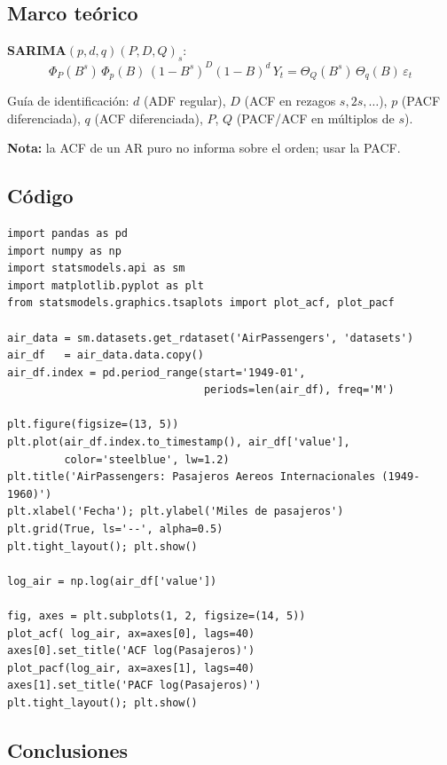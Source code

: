 \documentclass[12pt,letterpaper]{article}
\begin{document}
\subsection{Marco te\'orico}

\textbf{SARIMA$(p,d,q)(P,D,Q)_s$}:
\begin{equation}
  \Phi_P(B^s)\,\Phi_p(B)\,(1-B^s)^D(1-B)^d\,Y_t
  = \Theta_Q(B^s)\,\Theta_q(B)\,\varepsilon_t
\end{equation}

Gu\'ia de identificaci\'on:
$d$ (ADF regular), $D$ (ACF en rezagos $s,2s,\ldots$),
$p$ (PACF diferenciada), $q$ (ACF diferenciada),
$P$, $Q$ (PACF/ACF en m\'ultiplos de $s$).

\textbf{Nota:} la ACF de un AR puro no informa sobre el orden; usar la PACF.

\subsection{C\'odigo}

\begin{lstlisting}[style=python, caption={Dataset AirPassengers: carga y exploraci\'on}]
import pandas as pd
import numpy as np
import statsmodels.api as sm
import matplotlib.pyplot as plt
from statsmodels.graphics.tsaplots import plot_acf, plot_pacf

air_data = sm.datasets.get_rdataset('AirPassengers', 'datasets')
air_df   = air_data.data.copy()
air_df.index = pd.period_range(start='1949-01',
                               periods=len(air_df), freq='M')

plt.figure(figsize=(13, 5))
plt.plot(air_df.index.to_timestamp(), air_df['value'],
         color='steelblue', lw=1.2)
plt.title('AirPassengers: Pasajeros Aereos Internacionales (1949-1960)')
plt.xlabel('Fecha'); plt.ylabel('Miles de pasajeros')
plt.grid(True, ls='--', alpha=0.5)
plt.tight_layout(); plt.show()

log_air = np.log(air_df['value'])

fig, axes = plt.subplots(1, 2, figsize=(14, 5))
plot_acf( log_air, ax=axes[0], lags=40)
axes[0].set_title('ACF log(Pasajeros)')
plot_pacf(log_air, ax=axes[1], lags=40)
axes[1].set_title('PACF log(Pasajeros)')
plt.tight_layout(); plt.show()
\end{lstlisting}

\subsection{Conclusiones}
\end{document}
